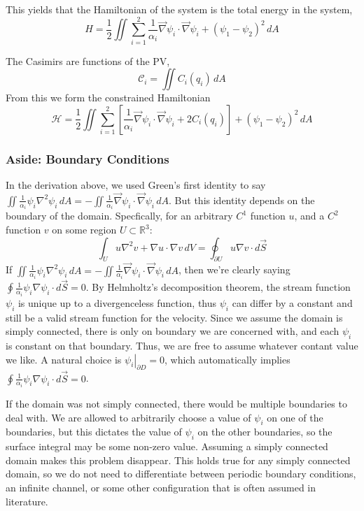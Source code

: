 \documentclass[12pt]{article}
\begin{document}
    This yields that the Hamiltonian of the system is the total energy in the system,
    $$
    H = \frac12 \iint \sum_{i=1}^2 \frac{1}{\alpha_i}\vec\nabla \psi_i \cdot \vec\nabla \psi_i + (\psi_1 - \psi_2)^2 \, dA
    $$

    The Casimirs are functions of the PV,
    $$
    \mathcal{C}_i = \iint C_i(q_i) \, dA
    $$
    From this we form the constrained Hamiltonian
    \begin{equation}
      \mathcal{H} = \frac12 \iint \sum_{i=1}^2 \left[ \frac{1}{\alpha_i} \vec\nabla \psi_i \cdot \vec\nabla \psi_i + 2C_i(q_i) \right]+ (\psi_1 - \psi_2)^2 \, dA
      \label{eqn:qg_tl_h}
    \end{equation}

    \subsubsection{Aside: Boundary Conditions}
      In the derivation above, we used Green's first identity to say $\iint \frac{1}{\alpha_i}\psi_i \nabla^2 \psi_i \, dA = - \iint \frac{1}{\alpha_i} \vec\nabla\psi_i \cdot \vec\nabla\psi_i \, dA$. But this identity depends on the boundary of the domain. Specfically, for an arbitrary $C^1$ function $u$, and a $C^2$ function $v$ on some region $U \subset \mathbb{R}^3$:
      $$
        \int_U u \nabla^2 v + \nabla u \cdot \nabla v \, dV = \oint_{\partial U} u \nabla v \cdot d \vec S
      $$
      If $\iint \frac{1}{\alpha_i}\psi_i \nabla^2 \psi_i \, dA = - \iint \frac{1}{\alpha_i} \vec\nabla\psi_i \cdot \vec\nabla\psi_i \, dA$, then we're clearly saying $\oint \frac{1}{\alpha_i}\psi_i \nabla \psi_i\cdot d \vec S = 0$. By Helmholtz's decomposition theorem, the stream function $\psi_i$ is unique up to a divergenceless function, thus $\psi_i$ can differ by a constant and still be a valid stream function for the velocity. Since we assume the domain is simply connected, there is only on boundary we are concerned with, and each $\psi_i$ is constant on that boundary. Thus, we are free to assume whatever contant value we like. A natural choice is $\left. \psi_i \right|_{\partial D} = 0$, which automatically implies $\oint \frac{1}{\alpha_i}\psi_i \nabla \psi_i \cdot d \vec S = 0$.

      If the domain was not simply connected, there would be multiple boundaries to deal with. We are allowed to arbitrarily choose a value of $\psi_i$ on one of the boundaries, but this dictates the value of $\psi_i$ on the other boundaries, so the surface integral may be some non-zero value. Assuming a simply connected domain makes this problem disappear. This holds true for any simply connected domain, so we do not need to differentiate between periodic boundary conditions, an infinite channel, or some other configuration that is often assumed in literature.
\end{document}

